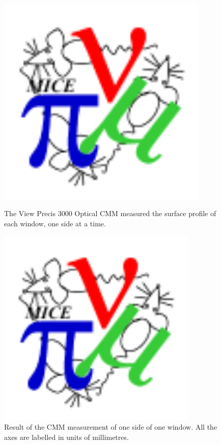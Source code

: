 \begin{figure}
  \begin{minipage}{0.46\textwidth}
    \centerline{\includegraphics*[width=0.9\textwidth]{LBL_measure3}}
    \caption{
      The View Precis 3000 Optical CMM measured the surface profile of
      each window, one side at a time.
    }
    \label{LBL_CMM}
  \end{minipage}\hfill%
  \begin{minipage}{0.46\textwidth}
    \centerline{\includegraphics*[width=0.85\textwidth]{LBL-win003-7B}}
    \caption{
      Result of the CMM measurement of one side of one window. All the axes are
      labelled in units of millimetres.
    }
    \label{LBL_CMM2}
  \end{minipage}
\end{figure}

